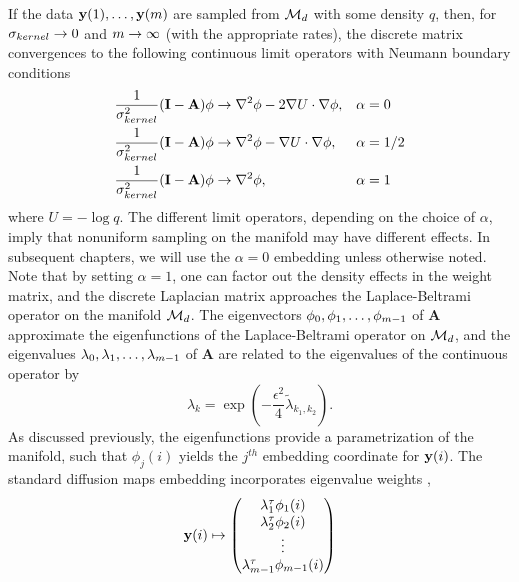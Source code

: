 If the data $\mathbf{y}(1), \dots, \mathbf{y}(m)$ are sampled from $\mathcal{M}_d$ with some density $q$, then, for $\sigma_{kernel} \rightarrow 0$ and $m \rightarrow \infty$ (with the appropriate rates), the discrete matrix convergences to the following continuous limit operators with Neumann boundary conditions \cite{coifman2006geometric}
\begin{equation} \label{eq:limiting_operator}
\begin{aligned}
\frac{1}{\sigma_{kernel}^2}(\mathbf{I}-\mathbf{A}) \phi &\rightarrow \nabla^2 \phi - 2\nabla U \cdot \nabla \phi, &&\alpha = 0 \\
\frac{1}{\sigma_{kernel}^2}(\mathbf{I}-\mathbf{A}) \phi &\rightarrow \nabla^2 \phi - \nabla U \cdot \nabla \phi, &&\alpha = 1/2 \\
\frac{1}{\sigma_{kernel}^2}(\mathbf{I}-\mathbf{A}) \phi &\rightarrow \nabla^2 \phi, &&\alpha = 1
\end{aligned}
\end{equation}
where $U = - \log q$.
%
The different limit operators, depending on the choice of $\alpha$, imply that nonuniform sampling on the manifold may have different effects. 
%
In subsequent chapters, we will use the $\alpha=0$ embedding unless otherwise noted. 
%
Note that by setting $\alpha=1$, one can factor out the density effects in the weight matrix, and the discrete Laplacian matrix approaches the Laplace-Beltrami operator on the manifold $\mathcal{M}_d$.
%
The eigenvectors $\phi_0, \phi_1, \dots, \phi_{m-1}$ of $\mathbf{A}$ approximate the eigenfunctions of the Laplace-Beltrami operator on $\mathcal{M}_d$,
and the eigenvalues $\lambda_0, \lambda_1, \dots, \lambda_{m-1}$ of $\mathbf{A}$ are related to the eigenvalues of the continuous operator by
\begin{equation} \label{eq:evals_relationship}
\lambda_k = \exp \left( -\frac{\epsilon^2}{4} \tilde{\lambda}_{k_1, k_2}  \right).
\end{equation}
%
As discussed previously, the eigenfunctions provide a parametrization of the manifold, such that $\phi_{j}(i)$ yields the $j^{th}$ embedding coordinate for $\mathbf{y}(i)$.
%
The standard diffusion maps embedding incorporates eigenvalue weights \cite{coifman2005geometric, coifman2006geometric},
%
\begin{equation} \label{eq:dmaps_embed_full}
\mathbf{y}(i) \mapsto 
\begin{pmatrix}
\lambda_1^\tau \phi_1(i) \\
\lambda_2^\tau \phi_2(i) \\
\vdots \\
\lambda_{m-1}^\tau  \phi_{m-1}(i)
\end{pmatrix}
\end{equation}
